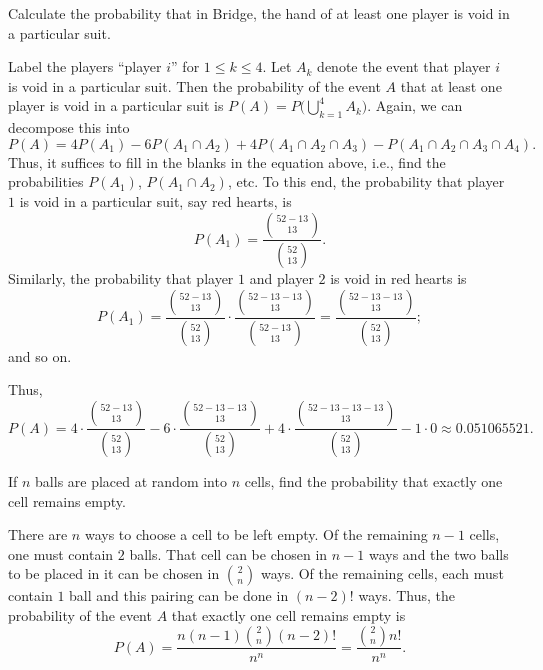 \begin{problem}[Handout 2, \# 7]
  Calculate the probability that in Bridge, the hand of at least one player
  is void in a particular suit.
\end{problem}
\begin{solution*}
  Label the players ``player \(i\)'' for \(1\leq k\leq 4\). Let \(A_k\)
  denote the event that player \(i\) is void in a particular suit. Then
  the probability of the event \(A\) that at least one player is void in a
  particular suit is \(P(A)=P\bigl(\bigcup_{k=1}^4 A_k\bigr)\). Again, we
  can decompose this into
  \[
    P(A)=4P(A_1)-6P(A_1\cap A_2)+4P(A_1\cap A_2\cap A_3)-P(A_1\cap A_2\cap
    A_3\cap A_4).
  \]
  Thus, it suffices to fill in the blanks in the equation above, i.e., find
  the probabilities \(P(A_1)\), \(P(A_1\cap A_2)\), etc. To this end, the
  probability that player \(1\) is void in a particular suit, say red
  hearts, is
  \[
    P(A_1)=\frac{\binom{52-13}{13}}{\binom{52}{13}}.
  \]
  Similarly, the probability that player \(1\) and player \(2\) is void in
  red hearts is
  \[
    P(A_1)=\frac{\binom{52-13}{13}}{\binom{52}{13}}\cdot\frac{\binom{52-13-13}{13}}{\binom{52-13}{13}}=\frac{\binom{52-13-13}{13}}{\binom{52}{13}};
  \]
  and so on.

  Thus,
  \[
    P(A)=4\cdot\frac{\binom{52-13}{13}}{\binom{52}{13}}
    -6\cdot\frac{\binom{52-13-13}{13}}{\binom{52}{13}}
    +4\cdot\frac{\binom{52-13-13-13}{13}}{\binom{52}{13}}
    -1\cdot0\approx \num{0.051065521}.
  \]
\end{solution*}

\begin{problem}[Handout 2, \# 12]
  If \(n\) balls are placed at random into \(n\) cells, find the
  probability that exactly one cell remains empty.
\end{problem}
\begin{solution*}
  There are \(n\) ways to choose a cell to be left empty. Of the remaining
  \(n-1\) cells, one must contain \(2\) balls. That cell can be chosen in
  \(n-1\) ways and the two balls to be placed in it can be chosen in
  \(\binom{2}{n}\) ways. Of the remaining cells, each must contain \(1\)
  ball and this pairing can be done in \((n-2)!\) ways. Thus, the
  probability of the event \(A\) that exactly one cell remains empty is
  \[
    P(A)=\frac{n(n-1)\binom{2}{n}(n-2)!}{n^n}=\frac{\binom{2}{n}n!}{n^n}.
  \]
\end{solution*}

